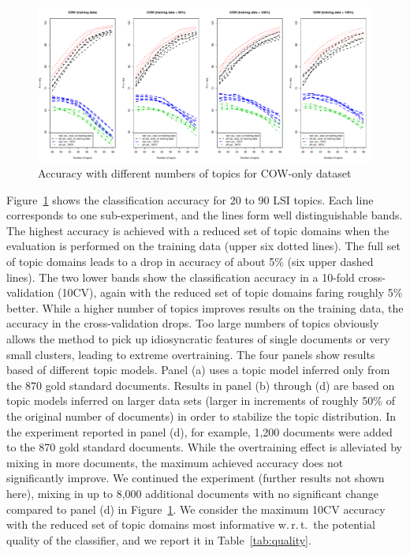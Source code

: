 \documentclass[11pt]{article}
\begin{document}
\begin{figure}[ht]
  \centering
  \includegraphics[width=\textwidth]{graphics/cow.pdf}
  \caption{Accuracy with different numbers of topics for COW-only dataset}
  \label{fig:cow}
\end{figure}

Figure~\ref{fig:cow} shows the classification accuracy for 20 to 90 LSI topics.
Each line corresponds to one sub-experiment, and the lines form well distinguishable bands.
The highest accuracy is achieved with a reduced set of topic domains when the evaluation is performed on the training data (upper six dotted lines).
The full set of topic domains leads to a drop in accuracy of about 5\% (six upper dashed lines).
The two lower bands show the classification accuracy in a 10-fold cross-validation (10CV), again with the reduced set of topic domains faring roughly 5\% better.
While a higher number of topics improves results on the training data, the accuracy in the cross-validation drops.
Too large numbers of topics obviously allows the method to pick up idiosyncratic features of single documents or very small clusters, leading to extreme overtraining.
The four panels show results based of different topic models.
Panel (a) uses a topic model inferred only from the 870 gold standard documents.
Results in panel (b) through (d) are based on topic models inferred on larger data sets (larger in increments of roughly 50\% of the original number of documents) in order to stabilize the topic distribution.
In the experiment reported in panel (d), for example, 1,200 documents were added to the 870 gold standard documents.
While the overtraining effect is alleviated by mixing in more documents, the maximum achieved accuracy does not significantly improve.
We continued the experiment (further results not shown here), mixing in up to 8,000 additional documents with no significant change compared to panel (d) in Figure~\ref{fig:cow}.
We consider the maximum 10CV accuracy with the reduced set of topic domains most informative w.\,r.\,t.\ the potential quality of the classifier, and we report it in Table~\ref{tab:quality}.
\end{document}
